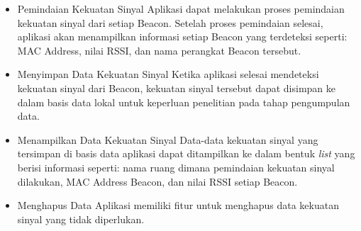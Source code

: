 \begin {itemize}
\itemsep0em
\item Pemindaian Kekuatan Sinyal \newline
Aplikasi dapat melakukan proses pemindaian kekuatan sinyal dari setiap Beacon. Setelah proses pemindaian selesai, aplikasi akan menampilkan informasi setiap Beacon yang terdeteksi seperti: MAC Address, nilai RSSI, dan nama perangkat Beacon tersebut. 

\item Menyimpan Data Kekuatan Sinyal \newline
Ketika aplikasi selesai mendeteksi kekuatan sinyal dari Beacon, kekuatan sinyal tersebut dapat disimpan ke dalam basis data lokal untuk keperluan penelitian pada tahap pengumpulan data.

\item Menampilkan Data Kekuatan Sinyal \newline
Data-data kekuatan sinyal yang tersimpan di basis data aplikasi dapat ditampilkan ke dalam bentuk \textit{list} yang berisi informasi seperti: nama ruang dimana pemindaian kekuatan sinyal dilakukan, MAC Address Beacon, dan nilai RSSI setiap Beacon.

\item Menghapus Data \newline
Aplikasi memiliki fitur untuk menghapus data kekuatan sinyal yang tidak diperlukan. 

\end{itemize}

